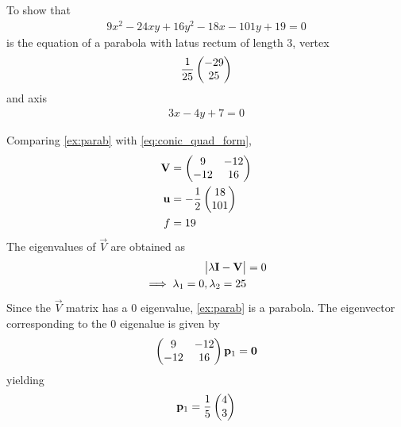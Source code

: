 
\begin{example}[parabola]
	To show that 
	\begin{align}
		9x^2 - 24xy + 16y^2-18x-101y+19=0
    \label{ex:parab}
	\end{align}
	is the equation of a parabola with latus rectum of length 3, vertex 
	\begin{align}
    \label{ex:parab-vertex}
		\frac{1}{25}\begin{pmatrix}-29\\25\end{pmatrix}
	\end{align}
	and
	axis 
	\begin{align}
    \label{ex:parab-axis}
    3x-4y+7 = 0
	\end{align}
\end{example}
\solution 
	Comparing 
    \eqref{ex:parab}
with 
    \eqref{eq:conic_quad_form}, 
\begin{align}
    \label{ex:parab-V}
	\mathbf{V} &=\begin{pmatrix}9 & -12 \\ -12 & 16\end{pmatrix}
\\
    \label{ex:parab-u}
	\mathbf{u} &= -\frac{1}{2}\begin{pmatrix}18 \\ 101\end{pmatrix}
\\
    \label{ex:parab-f}
f &= 19
    \end{align}
    The eigenvalues of $\vec{V}$ are obtained as 
\begin{align}
	\begin{vmatrix}\lambda\mathbf{I}-\mathbf{V}\end{vmatrix} &=0
	\\
	\implies 	
	 \lambda_1 = 0, \lambda_2 = 25
	 \label{ex:parab-lam}
    \end{align}
    Since the $\vec{V}$ matrix has a 0 eigenvalue, 
    \eqref{ex:parab} is a parabola.
    The eigenvector corresponding to the 0 eigenalue is given by 
    \begin{align}
	    \begin{pmatrix}9 & -12 \\ -12 & 16\end{pmatrix}\mathbf{p}_1 = \mathbf{0}
    \end{align}
    yielding
    \begin{align}
 \mathbf{p}_1 = \frac{1}{5}\begin{pmatrix}4 \\ 3\end{pmatrix} 
	    \label{eq:parab-evec}
    \end{align}
